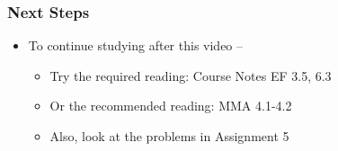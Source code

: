 \documentclass[10pt,english,aspectratio=169]{beamer}
\begin{document}
\begin{frame} \frametitle{Next Steps}

\begin{itemize}
\setlength\itemsep{5mm}
\item To continue studying after this video -- \vspace{2mm}

\begin{itemize}
 \setlength\itemsep{3mm}
 \item Try the required reading: Course Notes EF 3.5, 6.3
 \item Or the recommended reading: MMA 4.1-4.2
 \item Also, look at the problems in Assignment 5
\end{itemize}
\end{itemize}


\end{frame}
\end{document}
